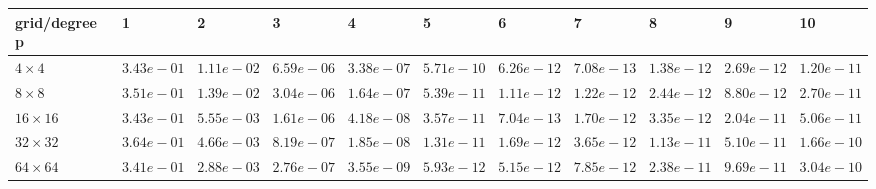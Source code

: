 \begin{tabular}{lllllllllll}
\hline
 grid/degree p   & 1          & 2          & 3          & 4          & 5          & 6          & 7          & 8          & 9          & 10         \\
\hline
 $4 \times 4$    & $3.43e-01$ & $1.11e-02$ & $6.59e-06$ & $3.38e-07$ & $5.71e-10$ & $6.26e-12$ & $7.08e-13$ & $1.38e-12$ & $2.69e-12$ & $1.20e-11$ \\
 $8 \times 8$    & $3.51e-01$ & $1.39e-02$ & $3.04e-06$ & $1.64e-07$ & $5.39e-11$ & $1.11e-12$ & $1.22e-12$ & $2.44e-12$ & $8.80e-12$ & $2.70e-11$ \\
 $16 \times 16$  & $3.43e-01$ & $5.55e-03$ & $1.61e-06$ & $4.18e-08$ & $3.57e-11$ & $7.04e-13$ & $1.70e-12$ & $3.35e-12$ & $2.04e-11$ & $5.06e-11$ \\
 $32 \times 32$  & $3.64e-01$ & $4.66e-03$ & $8.19e-07$ & $1.85e-08$ & $1.31e-11$ & $1.69e-12$ & $3.65e-12$ & $1.13e-11$ & $5.10e-11$ & $1.66e-10$ \\
 $64 \times 64$  & $3.41e-01$ & $2.88e-03$ & $2.76e-07$ & $3.55e-09$ & $5.93e-12$ & $5.15e-12$ & $7.85e-12$ & $2.38e-11$ & $9.69e-11$ & $3.04e-10$ \\
\hline
\end{tabular}